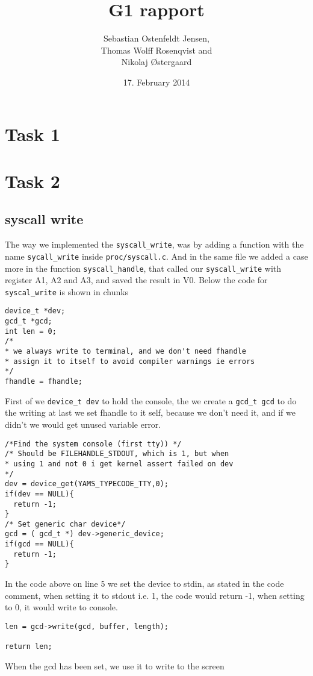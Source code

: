 \documentclass[11pt]{article}
\begin{document}
\title{G1 rapport}
\author{Sebastian Ostenfeldt Jensen,\\ Thomas Wolff Rosenqvist and\\ Nikolaj Østergaard}
\date{17. February 2014}
\maketitle
\thispagestyle{empty}
\pagebreak
{}
\setcounter{page}{1}

\section{Task 1}

\section{Task 2}

\subsection{syscall write}
The way we implemented the \verb|syscall_write|, was by adding a function with the name \verb|sycall_write| inside \verb|proc/syscall.c|. And in the same file we added a case more in the function \verb|syscall_handle|, that called our \verb|syscall_write| with register A1, A2 and A3, and saved the result in V0. Below the code for \verb|syscal_write| is shown in chunks
\newline
\begin{lstlisting}
device_t *dev;
gcd_t *gcd;
int len = 0;
/*
* we always write to terminal, and we don't need fhandle
* assign it to itself to avoid compiler warnings ie errors
*/
fhandle = fhandle;
\end{lstlisting}
First of we \verb|device_t dev| to hold the console, the we create a \verb|gcd_t gcd| to do the writing at last we set fhandle to it self, because we don't need it, and if we didn't we would get unused variable error.
\newline
\begin{lstlisting}
/*Find the system console (first tty)) */
/* Should be FILEHANDLE_STDOUT, which is 1, but when
* using 1 and not 0 i get kernel assert failed on dev
*/
dev = device_get(YAMS_TYPECODE_TTY,0);
if(dev == NULL){
  return -1;
}
/* Set generic char device*/
gcd = ( gcd_t *) dev->generic_device;
if(gcd == NULL){
  return -1;
}
\end{lstlisting}
In the code above on line 5 we set the device to stdin, as stated in the code comment, when setting it to stdout i.e. 1, the code would return -1, when setting to 0, it would write to console.
\newline
\begin{lstlisting}
len = gcd->write(gcd, buffer, length);

return len;
\end{lstlisting}
When the gcd has been set, we use it to write to the screen
\end{document}
